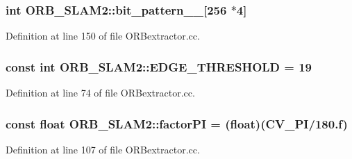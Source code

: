 \subsubsection[{\texorpdfstring{bit\+\_\+pattern\+\_\+31\+\_\+}{bit_pattern_31_}}]{\setlength{\rightskip}{0pt plus 5cm}int O\+R\+B\+\_\+\+S\+L\+A\+M2\+::bit\+\_\+pattern\+\_\+\_\+\mbox{[}256 $\ast$4\mbox{]}\hspace{0.3cm}{\ttfamily [static]}}\hypertarget{namespaceORB__SLAM2_a8dd21ee063eca2b0bc3f5e76ceba0492}{}\label{namespaceORB__SLAM2_a8dd21ee063eca2b0bc3f5e76ceba0492}


Definition at line 150 of file O\+R\+Bextractor.\+cc.

\subsubsection[{\texorpdfstring{E\+D\+G\+E\+\_\+\+T\+H\+R\+E\+S\+H\+O\+LD}{EDGE_THRESHOLD}}]{\setlength{\rightskip}{0pt plus 5cm}const int O\+R\+B\+\_\+\+S\+L\+A\+M2\+::\+E\+D\+G\+E\+\_\+\+T\+H\+R\+E\+S\+H\+O\+LD = 19}\hypertarget{namespaceORB__SLAM2_aec00f1ad4dea35755e3af4404282cd3b}{}\label{namespaceORB__SLAM2_aec00f1ad4dea35755e3af4404282cd3b}


Definition at line 74 of file O\+R\+Bextractor.\+cc.

\subsubsection[{\texorpdfstring{factor\+PI}{factorPI}}]{\setlength{\rightskip}{0pt plus 5cm}const float O\+R\+B\+\_\+\+S\+L\+A\+M2\+::factor\+PI = (float)(C\+V\+\_\+\+PI/180.f)}\hypertarget{namespaceORB__SLAM2_a8015b470ffeb885a0c90837a03b3210f}{}\label{namespaceORB__SLAM2_a8015b470ffeb885a0c90837a03b3210f}


Definition at line 107 of file O\+R\+Bextractor.\+cc.

